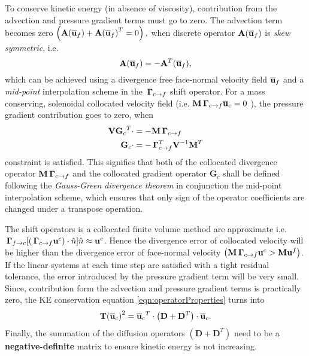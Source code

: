To conserve kinetic energy (in absence of viscosity), contribution from the advection and pressure gradient terms must go to zero. The advection term becomes zero $ \left( {\mathbf{A}(\overline{\mathbf{u}}_f)} + {\mathbf{A}(\overline{\mathbf{u}}_f)}^T = 0 \right),$ when discrete operator $\mathbf{A}(\overline{\mathbf{u}}_f)$ is \emph{skew symmetric}, i.e. 
\begin{equation}
{\mathbf{A}(\overline{\mathbf{u}}_f)} = - {\mathbf{A}^T(\overline{\mathbf{u}}_f)},
\label{eqn:advOpConstraint}
\end{equation}
which can be achieved using a divergence free face-normal velocity field $\overline{\mathbf{u}}_f$ and a \emph{mid-point} interpolation scheme in the $\, \mathbf{\Gamma}_{c \rightarrow f}$ shift operator. For a mass conserving, solenoidal collocated velocity field (i.e. $\mathbf{M} \, \mathbf{\Gamma}_{c \rightarrow f} \overline{\mathbf{u}}_c = 0$ ), the pressure gradient contribution goes to zero, when
\begin{align}
\begin{split}
\mathbf{V} {\mathbf{G}_c}^T \cdot &= - \mathbf{M} \, \mathbf{\Gamma}_{c \rightarrow f}
\\
{\mathbf{G}_c} \cdot &= - \, \mathbf{\Gamma}_{c \rightarrow f}^T \mathbf{V}^{-1} \mathbf{M}^T 
\end{split}
\label{eqn:gradOpConstraint}
\end{align}
constraint is satisfied. This signifies that both of the collocated divergence operator $\mathbf{M} \, \mathbf{\Gamma}_{c \rightarrow f}$ and the collocated gradient operator $ {\mathbf{G}_c} $ shall be defined following the \emph{Gauss-Green divergence theorem} in conjunction the mid-point interpolation scheme, which ensures that only sign of the operator coefficients are changed under a transpose operation. 

The shift operators is a collocated finite volume method are approximate i.e. $\, \mathbf{\Gamma}_{f \rightarrow c} [(\, \mathbf{\Gamma}_{c \rightarrow f} \mathbf{u}^c)\cdot \hat{n}]\hat{n} \approx \mathbf{u}^c$. Hence the divergence error of collocated velocity will be higher than the divergence error of face-normal velocity $\left(\mathbf{M} \, \mathbf{\Gamma}_{c \rightarrow f} \mathbf{u}^c > \mathbf{M} \mathbf{u}^f \right)$. If the linear systems at each time step are satisfied with a tight residual tolerance, the error introduced by the pressure gradient term will be very small. Since, contribution form the advection and pressure gradient terms is practically zero, the KE conservation equation \eqref{eqn:operatorProperties} turns into 
\begin{equation}
\begin{split}
\mathbf{T} {(\overline{\mathbf{u}}_c)}^2 
= {\overline{\mathbf{u}}_c}^T \cdot
 \left( \mathbf{D} + {\mathbf{D}}^T \right)
 \cdot {\overline{\mathbf{u}}_c}.
\end{split}
\end{equation}
Finally, the summation of the diffusion operators $\left( \mathbf{D} + {\mathbf{D}}^T \right)$ need to be a \textbf{negative-definite} matrix to ensure kinetic energy is not increasing.


